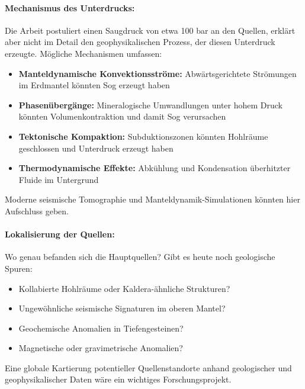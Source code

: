 ﻿\documentclass[12pt,a4paper]{report}
\begin{document}
\paragraph{Mechanismus des Unterdrucks:}
Die Arbeit postuliert einen Saugdruck von etwa 100 bar an den Quellen, erklärt aber nicht im Detail den geophysikalischen Prozess, der diesen Unterdruck erzeugte. Mögliche Mechanismen umfassen:

\begin{itemize}
	\item \textbf{Manteldynamische Konvektionsströme:} Abwärtsgerichtete Strömungen im Erdmantel könnten Sog erzeugt haben
	
	\item \textbf{Phasenübergänge:} Mineralogische Umwandlungen unter hohem Druck könnten Volumenkontraktion und damit Sog verursachen
	
	\item \textbf{Tektonische Kompaktion:} Subduktionszonen könnten Hohlräume geschlossen und Unterdruck erzeugt haben
	
	\item \textbf{Thermodynamische Effekte:} Abkühlung und Kondensation überhitzter Fluide im Untergrund
\end{itemize}

Moderne seismische Tomographie und Manteldynamik-Simulationen könnten hier Aufschluss geben.

\paragraph{Lokalisierung der Quellen:}
Wo genau befanden sich die Hauptquellen? Gibt es heute noch geologische Spuren:
\begin{itemize}
	\item Kollabierte Hohlräume oder Kaldera-ähnliche Strukturen?
	\item Ungewöhnliche seismische Signaturen im oberen Mantel?
	\item Geochemische Anomalien in Tiefengesteinen?
	\item Magnetische oder gravimetrische Anomalien?
\end{itemize}

Eine globale Kartierung potentieller Quellenstandorte anhand geologischer und geophysikalischer Daten wäre ein wichtiges Forschungsprojekt.
\end{document}
